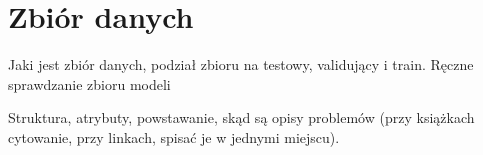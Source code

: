 
\chapter{Zbiór danych}

Jaki jest zbiór danych, podział zbioru na testowy, validujący i train. Ręczne sprawdzanie zbioru modeli

Struktura, atrybuty, powstawanie, skąd są opisy problemów (przy książkach cytowanie, przy linkach, spisać je w jednymi miejscu).